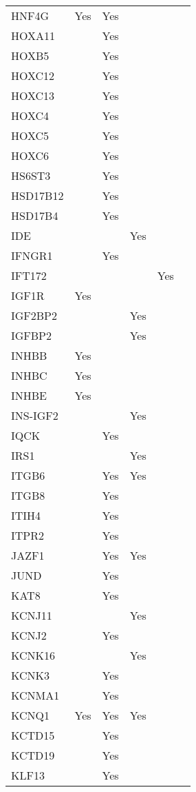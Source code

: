 \documentclass[]{report}
\begin{document}
\begin{appendices}
\begin{longtable}[t]{llllll}
HNF4G & Yes & Yes &  &  & \\
HOXA11 &  & Yes &  &  & \\
HOXB5 &  & Yes &  &  & \\
HOXC12 &  & Yes &  &  & \\
HOXC13 &  & Yes &  &  & \\
HOXC4 &  & Yes &  &  & \\
HOXC5 &  & Yes &  &  & \\
HOXC6 &  & Yes &  &  & \\
HS6ST3 &  & Yes &  &  & \\
HSD17B12 &  & Yes &  &  & \\
HSD17B4 &  & Yes &  &  & \\
IDE &  &  & Yes &  & \\
IFNGR1 &  & Yes &  &  & \\
IFT172 &  &  &  & Yes & \\
IGF1R & Yes &  &  &  & \\
IGF2BP2 &  &  & Yes &  & \\
IGFBP2 &  &  & Yes &  & \\
INHBB & Yes &  &  &  & \\
INHBC & Yes &  &  &  & \\
INHBE & Yes &  &  &  & \\
INS-IGF2 &  &  & Yes &  & \\
IQCK &  & Yes &  &  & \\
IRS1 &  &  & Yes &  & \\
ITGB6 &  & Yes & Yes &  & \\
ITGB8 &  & Yes &  &  & \\
ITIH4 &  & Yes &  &  & \\
ITPR2 &  & Yes &  &  & \\
JAZF1 &  & Yes & Yes &  & \\
JUND &  & Yes &  &  & \\
KAT8 &  & Yes &  &  & \\
KCNJ11 &  &  & Yes &  & \\
KCNJ2 &  & Yes &  &  & \\
KCNK16 &  &  & Yes &  & \\
KCNK3 &  & Yes &  &  & \\
KCNMA1 &  & Yes &  &  & \\
KCNQ1 & Yes & Yes & Yes &  & \\
KCTD15 &  & Yes &  &  & \\
KCTD19 &  & Yes &  &  & \\
KLF13 &  & Yes &  &  & \\

\end{longtable}
\end{appendices}
\end{document}
